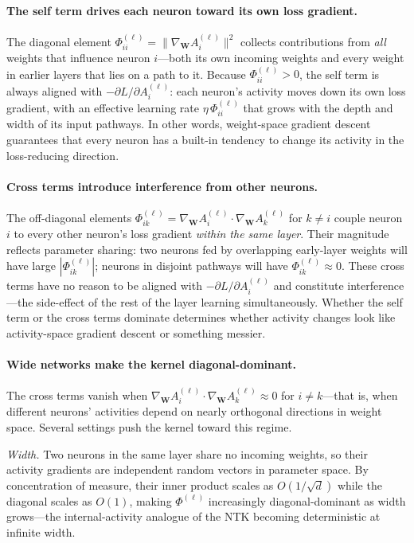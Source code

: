 \documentclass[10pt]{article}
\newcommand{\vW}{\mathbf{W}}
\newcommand{\grad}{\nabla_{\!\vW}}
\begin{document}
\paragraph{The self term drives each neuron toward its own loss gradient.}
The diagonal element $\Phi^{(\ell)}_{ii}=\lVert\grad A_i^{(\ell)}\rVert^2$ collects contributions from \emph{all} weights that influence neuron $i$---both its own incoming weights and every weight in earlier layers that lies on a path to it.  Because $\Phi^{(\ell)}_{ii}>0$, the self term is always aligned with $-\partial L/\partial A_i^{(\ell)}$: each neuron's activity moves down its own loss gradient, with an effective learning rate $\eta\,\Phi^{(\ell)}_{ii}$ that grows with the depth and width of its input pathways.  In other words, weight-space gradient descent guarantees that every neuron has a built-in tendency to change its activity in the loss-reducing direction.

\paragraph{Cross terms introduce interference from other neurons.}
The off-diagonal elements $\Phi^{(\ell)}_{ik}=\grad A_i^{(\ell)}\cdot\grad A_k^{(\ell)}$ for $k\neq i$ couple neuron $i$ to every other neuron's loss gradient \emph{within the same layer}.  Their magnitude reflects parameter sharing: two neurons fed by overlapping early-layer weights will have large $|\Phi^{(\ell)}_{ik}|$; neurons in disjoint pathways will have $\Phi^{(\ell)}_{ik}\approx 0$.  These cross terms have no reason to be aligned with $-\partial L/\partial A_i^{(\ell)}$ and constitute interference---the side-effect of the rest of the layer learning simultaneously.  Whether the self term or the cross terms dominate determines whether activity changes look like activity-space gradient descent or something messier.

\paragraph{Wide networks make the kernel diagonal-dominant.}
The cross terms vanish when $\grad A_i^{(\ell)} \cdot \grad A_k^{(\ell)} \approx 0$ for $i\neq k$---that is, when different neurons' activities depend on nearly orthogonal directions in weight space.  Several settings push the kernel toward this regime.

\emph{Width.}  Two neurons in the same layer share no incoming weights, so their activity gradients are independent random vectors in parameter space.  By concentration of measure, their inner product scales as $O(1/\sqrt{d})$ while the diagonal scales as $O(1)$, making $\Phi^{(\ell)}$ increasingly diagonal-dominant as width grows---the internal-activity analogue of the NTK becoming deterministic at infinite width.
\end{document}
